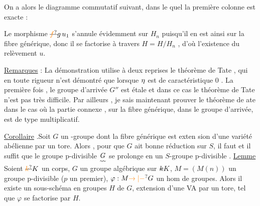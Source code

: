 On a alors le diagramme commutatif suivant, dans le quel la première
colonne est exacte :

Le morphisme $\deleted{\unsure{f}}\handwritten{g}\,u_1$ s'annule évidemment sur $H_n$ puisqu'il en est ainsi sur
la fibre générique, donc il se factorise à travers $H=H/H_n$ , d'où l'existence du relèvement $u$.

\uline{Remarques} : La démonstration utilise à deux reprises le théorème de Tate ,
qui en toute rigueur n'est démontré que lorsque $\handwritten{\eta}$ est de caractéristique
0 . La première fois , le groupe d'arrivée $G''$ est étale et dans ce cas le
théorème de Tate n'est pas très difficile. Par ailleurs , je sais maintenant
prouver le théorème de ate dans le cas où la partie connexe , sur la fibre
générique, dans le groupe d'arrivée, est de type multiplicatif.

\uline{Corollaire} .Soit $G$ un \inserted{$\handwritten{\eta}$}-groupe  dont la fibre générique est exten%
%
%
sion d'une variété abélienne par un tore. Alors , pour que $G$  ait bonne
réduction  sur $S$, il faut et il suffit que le groupe p-divisible $\underset{\scriptscriptstyle\sim\!\sim}{G}$ se
prolonge en un $S$-groupe p-divisible .
\uline{Lemme} Soient $\deleted{\unsure{k}}K$ un corps, $G$ un groupe algébrique sur $\deleted{k}K$,
$M=(M(n))$ un groupe p-divisible ($p$ un  premier),
$\varphi:M\unsure{\to|-}G$ un hom de groupes.  Alors  il existe
un sous-schéma en groupes $H$ de $G$, extension
d'une VA par un tore, tel que $\varphi$ se factorise
par $H$. 

